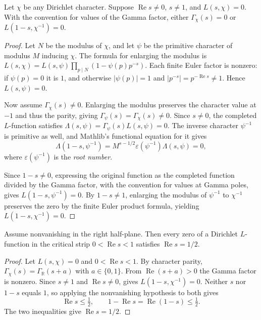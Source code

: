 \begin{lemma}
\label{lem:primitive-zero-reflection}
\emitthmsource
Let $\chi$ be any Dirichlet character. Suppose $\operatorname{Re}s\ne0$, $s\ne1$, and $L(s,\chi)=0$. With the convention for values of the Gamma factor, either $\Gamma_\chi(s)=0$ or $L(1-s,\chi^{-1})=0$.
\end{lemma}
\begin{proof}
Let $N$ be the modulus of $\chi$, and let $\psi$ be the primitive character of modulus $M$ inducing $\chi$. The formula for enlarging the modulus is $L(s,\chi)=L(s,\psi)\prod_{p\mid N}(1-\psi(p)p^{-s})$. Each finite Euler factor is nonzero: if $\psi(p)=0$ it is $1$, and otherwise $|\psi(p)|=1$ and $|p^{-s}|=p^{-\operatorname{Re}s}\ne1$. Hence $L(s,\psi)=0$.

Now assume $\Gamma_\chi(s)\ne0$. Enlarging the modulus preserves the character value at $-1$ and thus the parity, giving $\Gamma_\psi(s)=\Gamma_\chi(s)\ne0$. Since $s\ne0$, the completed $L$-function satisfies $\Lambda(s,\psi)=\Gamma_\psi(s)L(s,\psi)=0$. The inverse character $\psi^{-1}$ is primitive as well, and Mathlib's functional equation for it gives
\[
 \Lambda(1-s,\psi^{-1})=M^{s-1/2}\varepsilon(\psi^{-1})\Lambda(s,\psi)=0,
\]
where $\varepsilon(\psi^{-1})$ is the \emph{root number}.

Since $1-s\ne0$, expressing the original function as the completed function divided by the Gamma factor, with the convention for values at Gamma poles, gives $L(1-s,\psi^{-1})=0$. By $1-s\ne1$, enlarging the modulus of $\psi^{-1}$ to $\chi^{-1}$ preserves the zero by the finite Euler product formula, yielding $L(1-s,\chi^{-1})=0$.
\end{proof}

\begin{lemma}
\label{lem:dirichlet-reflection}
\emitthmsource
Assume nonvanishing in the right half-plane. Then every zero of a Dirichlet $L$-function in the critical strip $0<\operatorname{Re}s<1$ satisfies $\operatorname{Re}s=1/2$.
\end{lemma}
\begin{proof}
Let $L(s,\chi)=0$ and $0<\operatorname{Re}s<1$. By character parity, $\Gamma_\chi(s)=\Gamma_{\mathbb R}(s+a)$ with $a\in\{0,1\}$. From $\operatorname{Re}(s+a)>0$ the Gamma factor is nonzero. Since $s\ne1$ and $\operatorname{Re}s\ne0$,  gives $L(1-s,\chi^{-1})=0$. Neither $s$ nor $1-s$ equals $1$, so applying the nonvanishing hypothesis to both gives
\[
 \operatorname{Re}s\le\tfrac12,
 \qquad 1-\operatorname{Re}s=\operatorname{Re}(1-s)\le\tfrac12.
\]
The two inequalities give $\operatorname{Re}s=1/2$.
\end{proof}

